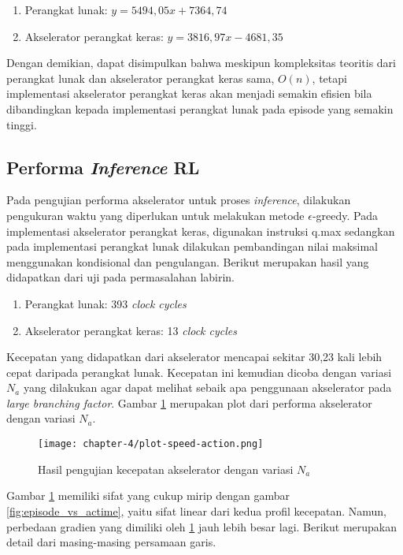 \begin{enumerate}
	\item Perangkat lunak: $y = 5494,05x + 7364,74$
	\item Akselerator perangkat keras: $y = 3816,97x - 4681,35$
\end{enumerate}

Dengan demikian, dapat disimpulkan bahwa meskipun kompleksitas teoritis dari perangkat lunak dan akselerator perangkat keras sama, $O(n)$, tetapi implementasi akselerator perangkat keras akan menjadi semakin efisien bila dibandingkan kepada implementasi perangkat lunak pada episode yang semakin tinggi.

\subsection{Performa \textit{Inference} \acl{RL}}
\label{subsec:performance-inference}

Pada pengujian performa akselerator untuk proses \textit{inference}, dilakukan pengukuran waktu yang diperlukan untuk melakukan metode $\epsilon$-greedy. Pada implementasi akselerator perangkat keras, digunakan instruksi q.max sedangkan pada implementasi perangkat lunak dilakukan pembandingan nilai maksimal menggunakan kondisional dan pengulangan. Berikut merupakan hasil yang didapatkan dari uji pada permasalahan labirin.

\begin{enumerate}
	\item Perangkat lunak: 393 \textit{clock cycles}
	\item Akselerator perangkat keras: 13 \textit{clock cycles}
\end{enumerate}

Kecepatan yang didapatkan dari akselerator mencapai sekitar 30,23 kali lebih cepat daripada perangkat lunak. Kecepatan ini kemudian dicoba dengan variasi $N_a$ yang dilakukan agar dapat melihat sebaik apa penggunaan akselerator pada \textit{large branching factor}. Gambar \ref{fig:speed-action} merupakan plot dari performa akselerator dengan variasi $N_a$.

\begin{figure}[htbp]
	\centering
	\texttt{[image: chapter-4/plot-speed-action.png]}
	\caption{Hasil pengujian kecepatan akselerator dengan variasi $N_a$}
	\label{fig:speed-action}
\end{figure}

Gambar \ref{fig:speed-action} memiliki sifat yang cukup mirip dengan gambar \ref{fig:episode_vs_actime}, yaitu sifat linear dari kedua profil kecepatan. Namun, perbedaan gradien yang dimiliki oleh \ref{fig:speed-action} jauh lebih besar lagi. Berikut merupakan detail dari masing-masing persamaan garis.

